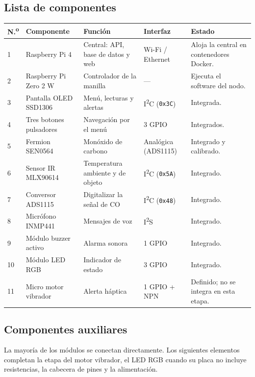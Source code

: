 \documentclass[10pt,a4paper]{article}
\newcommand{\code}[1]{{\small\urlstyle{tt}\nolinkurl{#1}}}
\begin{document}
\subsection{Lista de componentes}
\label{tab:componentes}
\begin{tabularx}{\linewidth}{@{}P{6mm}P{37mm}P{40mm}P{24mm}Y@{}}
\toprule\textbf{N.\textsuperscript{o}} & \textbf{Componente} & \textbf{Función} & \textbf{Interfaz} & \textbf{Estado}\\ & Raspberry Pi 4 & Central: API, base de datos y web & Wi-Fi / Ethernet & Aloja la central en contenedores Docker.\\
2 & Raspberry Pi Zero 2 W & Controlador de la manilla & --- & Ejecuta el software del nodo.\\
3 & Pantalla OLED SSD1306 & Menú, lecturas y alertas & I\textsuperscript{2}C (\code{0x3C}) & Integrada.\\
4 & Tres botones pulsadores & Navegación por el menú & 3 GPIO & Integrados.\\
5 & Fermion SEN0564 & Monóxido de carbono & Analógica (ADS1115) & Integrado y calibrado.\\
6 & Sensor IR MLX90614 & Temperatura ambiente y de objeto & I\textsuperscript{2}C (\code{0x5A}) & Integrado.\\
7 & Conversor ADS1115 & Digitalizar la señal de CO & I\textsuperscript{2}C (\code{0x48}) & Integrado.\\
8 & Micrófono INMP441 & Mensajes de voz & I\textsuperscript{2}S & Integrado.\\
9 & Módulo buzzer activo & Alarma sonora & 1 GPIO & Integrado.\\
10 & Módulo LED RGB & Indicador de estado & 3 GPIO & Integrado.\\
11 & Micro motor vibrador & Alerta háptica & 1 GPIO + NPN & Definido; no se integra en esta etapa.\\\bottomrule
\end{tabularx}

\subsection{Componentes auxiliares}
La mayoría de los módulos se conectan directamente. Los siguientes elementos completan la etapa del motor vibrador, el LED RGB cuando su placa no incluye resistencias, la cabecera de pines y la alimentación.
\end{document}

